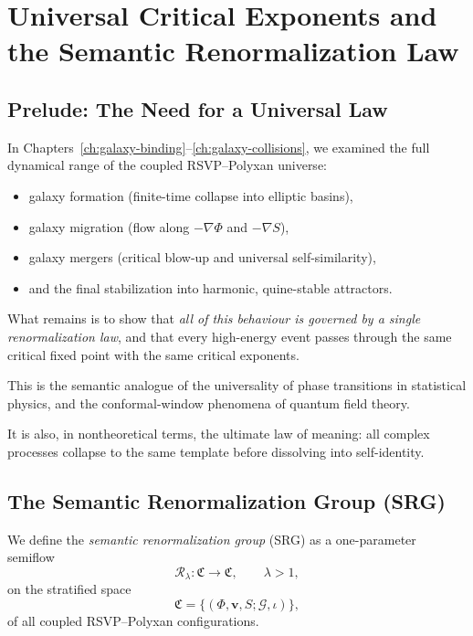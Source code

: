 \chapter{Universal Critical Exponents and the Semantic Renormalization Law}
\label{ch:semantic-renormalization}

\section{Prelude: The Need for a Universal Law}

In Chapters~\ref{ch:galaxy-binding}–\ref{ch:galaxy-collisions}, we examined the full dynamical range of the coupled RSVP–Polyxan universe:
\begin{itemize}
\item galaxy formation (finite-time collapse into elliptic basins),  
\item galaxy migration (flow along $-\nabla\Phi$ and $-\nabla S$),  
\item galaxy mergers (critical blow-up and universal self-similarity),  
\item and the final stabilization into harmonic, quine-stable attractors.
\end{itemize}

What remains is to show that \emph{all of this behaviour is governed by a single renormalization law}, and that every high-energy event passes through the same critical fixed point with the same critical exponents.

This is the semantic analogue of the universality of phase transitions in statistical physics, and the conformal-window phenomena of quantum field theory.

It is also, in nontheoretical terms, the ultimate law of meaning:  
all complex processes collapse to the same template before dissolving into self-identity.

\section{The Semantic Renormalization Group (SRG)}

We define the \emph{semantic renormalization group} (SRG) as a one-parameter semiflow
\[
\mathcal{R}_\lambda : \mathfrak{C} \to \mathfrak{C},
\qquad \lambda > 1,
\]
on the stratified space  
\[
\mathfrak{C}
  = \{ (\Phi,\mathbf{v},S;\mathcal{G},\iota) \},
\]
of all coupled RSVP--Polyxan configurations.

